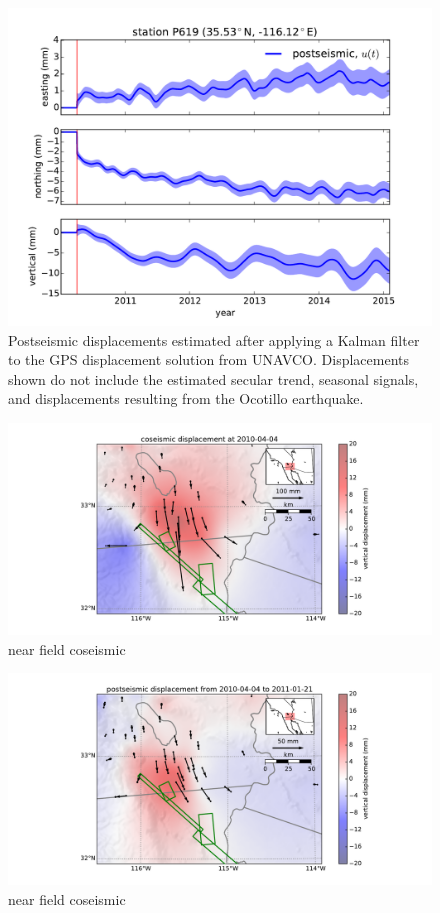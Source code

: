 \documentclass[12pt]{article}
\begin{document}
\begin{figure}

\includegraphics[scale=0.6]{Figures/figure_4}
\centering
\caption{Postseismic displacements estimated after applying a Kalman filter to the GPS displacement solution from UNAVCO.  Displacements shown do not include the estimated secular trend, seasonal signals, and displacements resulting from the Ocotillo earthquake.} 
\label{P619PS}
\end{figure}

\begin{figure}
\includegraphics[scale=0.6]{Figures/near_field_data_1}
\centering 
\caption{near field coseismic}
\label{nearfield1}
\end{figure}

\begin{figure}
\includegraphics[scale=0.6]{Figures/near_field_data_2}
\centering 
\caption{near field coseismic}
\label{nearfield2}
\end{figure}
\end{document}
